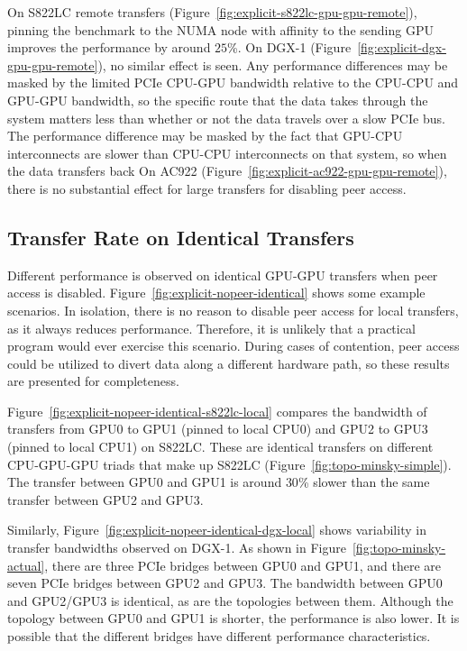 On S822LC remote transfers (Figure~\ref{fig:explicit-s822lc-gpu-gpu-remote}), pinning the benchmark to the NUMA node with affinity to the sending GPU improves the performance by around $25$\%.
On DGX-1 (Figure~\ref{fig:explicit-dgx-gpu-gpu-remote}), no similar effect is seen.
Any performance differences may be masked by the limited PCIe CPU-GPU bandwidth relative to the CPU-CPU and GPU-GPU bandwidth, so the specific route that the data takes through the system matters less than whether or not the data travels over a slow PCIe bus.
The performance difference may be masked by the fact that GPU-CPU interconnects are slower than CPU-CPU interconnects on that system, so when the data transfers back
On AC922 (Figure~\ref{fig:explicit-ac922-gpu-gpu-remote}), there is no substantial effect for large transfers for disabling peer access.

\subsection{Transfer Rate on Identical Transfers}
\label{sec:explicit-peer-identical}

Different performance is observed on identical GPU-GPU transfers when peer access is disabled.
Figure~\ref{fig:explicit-nopeer-identical} shows some example scenarios.
In isolation, there is no reason to disable peer access for local transfers, as it always reduces performance.
Therefore, it is unlikely that a practical program would ever exercise this scenario.
During cases of contention, peer access could be utilized to divert data along a different hardware path, so these results are presented for completeness.

Figure~\ref{fig:explicit-nopeer-identical-s822lc-local} compares the bandwidth of transfers from GPU0 to GPU1 (pinned to local CPU0) and GPU2 to GPU3 (pinned to local CPU1) on S822LC.
These are identical transfers on different CPU-GPU-GPU triads that make up S822LC (Figure~\ref{fig:topo-minsky-simple}).
The transfer between GPU0 and GPU1 is around $30$\% slower than the same transfer between GPU2 and GPU3.

Similarly, Figure~\ref{fig:explicit-nopeer-identical-dgx-local} shows variability in transfer bandwidths observed on DGX-1.
As shown in Figure~\ref{fig:topo-minsky-actual}, there are three PCIe bridges between GPU0 and GPU1, and there are seven PCIe bridges between GPU2 and GPU3.
The bandwidth between GPU0 and GPU2/GPU3 is identical, as are the topologies between them.
Although the topology between GPU0 and GPU1 is shorter, the performance is also lower.
It is possible that the different bridges have different performance characteristics.

